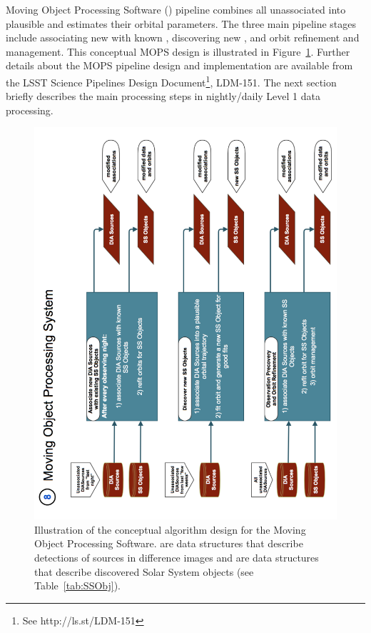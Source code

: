 Moving Object Processing Software () pipeline  combines all unassociated \DIASources into 
plausible \SSObjects and estimates their orbital parameters. The three main pipeline stages
include associating new \DIASources with known \SSObjects, discovering new \SSObjects, 
and orbit refinement and management. This conceptual MOPS design is illustrated in  
Figure~\ref{fig:Pipe8}. Further details about the MOPS pipeline design and implementation are available
from the LSST Science Pipelines Design Document\footnote{See http://ls.st/LDM-151}, LDM-151.
The next section briefly describes the main processing steps in nightly/daily Level 1 data processing. 

\begin{figure}[!t]
    \centering
    \includegraphics[scale=0.60, angle=270]{MOPS-Level0}
    \vskip -0.1in 
    \caption{Illustration of the conceptual algorithm design for the Moving Object Processing Software. 
   \DIASources are data structures that describe detections of sources in difference images and 
   \SSObjects are data structures that describe discovered Solar System objects (see Table~\ref{tab:SSObj}).
\label{fig:Pipe8}}    
\end{figure}


